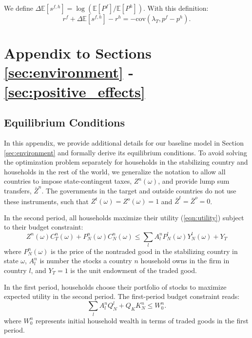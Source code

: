 We define
$\Delta\mathbb{E}\left[s^{f,h}\right]
=\log\left(\mathbb{E}\left[P^f\right]/\mathbb{E}\left[P^h\right]\right).$
With this definition:
\begin{equation*}
  r^f+\Delta\mathbb{E}\left[s^{f,h}\right]-r^h = -\text{cov}\left(\lambda_T,p^f-p^h\right).
\end{equation*}


\section{Appendix to Sections \ref{sec:environment} -
\ref{sec:positive_effects}}


\subsection{Equilibrium Conditions
  \label{Appendix_ModelDetails}}

In this appendix, we provide additional details for our baseline model
in Section \ref{sec:environment} and formally derive its equilibrium
conditions. To avoid solving the optimization problem separately for
households in the stabilizing country and households in the rest of
the world, we generalize the notation to allow all countries to impose
state-contingent taxes, $Z^n(\omega)$, and provide lump sum transfers,
$\bar{Z}^n$. The governments in the target and outside countries do
not use these instruments, such that $Z^t(\omega)=Z^o(\omega) = 1$ and
$\bar{Z}^t =\bar{Z}^o= 0$.

In the second period, all households maximize their utility
(\ref{eqn:utility}) subject to their budget constraint:
\begin{equation}
  Z^n(\omega) C_T^n(\omega) + P_N^n(\omega) C_N^n(\omega)  
  \le \sum_l A_l^n P_N^l(\omega) Y_N^l(\omega) + Y_T 
  \label{eqn:budget_cons_2}
\end{equation}
where $P^n_N(\omega)$ is the price of the nontraded good in the
stabilizing country in state $\omega$, $A^n_l$ is number the stocks a
country $n$ household owns in the firm in country $l$, and $Y_T = 1$
is the unit endowment of the traded good.

In the first period, households choose their portfolio of stocks to
maximize expected utility in the second period. The first-period
budget constraint reads:
\begin{equation}
  \sum_l A_l^n Q^l_N + Q_K K^n_N \le W^n_0.
  \label{eqn:budget_cons_1}
\end{equation}
where $W^n_0$ represents initial household wealth in terms of traded
goods in the first period.

